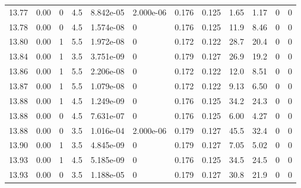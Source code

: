 \documentclass[preview]{standalone}
\begin{document}
{{{{{{{{{{{{{\begin{tabular}{L{1.2cm}C{1.2cm} C{0.3cm}C{0.5cm} C{1.4cm}C{1.4cm} C{1.4cm}C{1.4cm} C{1.6cm}C{1.6cm} C{1.6cm}C{1.6cm}}
  13.77  &  0.00  & 0     & 4.5 &  8.842e-05  & 2.000e-06  &  0.176&   0.125& 1.65 & 1.17   &  0 & 0  \\ 
  13.78  &  0.00  & 0     & 4.5 &  1.574e-08  & 0  &  0.176&   0.125& 11.9 & 8.46   &  0 & 0  \\ 
  13.80  &  0.00  & 1     & 5.5 &  1.972e-08  & 0  &  0.172&   0.122& 28.7 & 20.4   &  0 & 0  \\ 
  13.84  &  0.00  & 1     & 3.5 &  3.751e-09  & 0  &  0.179&   0.127& 26.9 & 19.2   &  0 & 0  \\ 
  13.86  &  0.00  & 1     & 5.5 &  2.206e-08  & 0  &  0.172&   0.122& 12.0 & 8.51   &  0 & 0  \\ 
  13.87  &  0.00  & 1     & 5.5 &  1.079e-08  & 0  &  0.172&   0.122& 9.13 & 6.50   &  0 & 0  \\ 
  13.88  &  0.00  & 1     & 4.5 &  1.249e-09  & 0  &  0.176&   0.125& 34.2 & 24.3   &  0 & 0  \\ 
  13.88  &  0.00  & 0     & 4.5 &  7.631e-07  & 0  &  0.176&   0.125& 6.00 & 4.27   &  0 & 0  \\ 
  13.88  &  0.00  & 0     & 3.5 &  1.016e-04  & 2.000e-06  &  0.179&   0.127& 45.5 & 32.4   &  0 & 0  \\ 
  13.90  &  0.00  & 1     & 3.5 &  4.845e-09  & 0  &  0.179&   0.127& 7.05 & 5.02   &  0 & 0  \\ 
  13.93  &  0.00  & 1     & 4.5 &  5.185e-09  & 0  &  0.176&   0.125& 34.5 & 24.5   &  0 & 0  \\ 
  13.93  &  0.00  & 0     & 3.5 &  1.188e-05  & 0  &  0.179&   0.127& 30.8 & 21.9   &  0 & 0  \\ 
\hline 
\end{tabular} 

}}}}}}}}}}}}}
\end{document}
